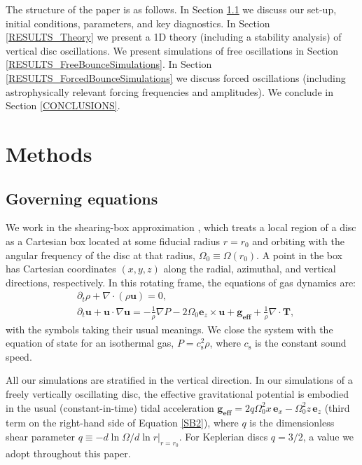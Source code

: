 \documentclass[fleqn,usenatbib]{mnras}
\begin{document}
The structure of the paper is as follows. In Section \ref{METHODS_GoverningEquations} we discuss our set-up, initial conditions, parameters, and key diagnostics. In Section \ref{RESULTS_Theory} we present a 1D theory (including a stability analysis) of vertical disc oscillations. We present simulations of free oscillations in Section \ref{RESULTS_FreeBounceSimulations}. In Section \ref{RESULTS_ForcedBounceSimulations} we discuss forced oscillations (including astrophysically relevant forcing frequencies and amplitudes). We conclude in Section \ref{CONCLUSIONS}.

\section{Methods}
\label{METHODS}

\subsection{Governing equations}
\label{METHODS_GoverningEquations}
We work in the shearing-box approximation
\citep{goldreich1965,hawley1995,latter2017local},
which treats a local region of a disc as a Cartesian box located at some fiducial radius $r = r_0$ and orbiting with the angular frequency of the disc at that radius, $\Omega_0 \equiv \Omega(r_0)$. A point in the box has
Cartesian coordinates $(x, y, z)$ along the radial, azimuthal, and vertical directions, respectively. In this rotating frame, the equations of gas dynamics are:
\begin{align}
&\partial_t \rho + \nabla \cdot (\rho \mathbf{u}) = 0, \label{SB1}\\
&\partial_t \mathbf{u} + \mathbf{u}\cdot\nabla \mathbf{u} = -\frac{1}{\rho} \nabla P - 2\Omega_0 \mathbf{e}_z \times \mathbf{u} + \mathbf{g_\text{eff}}+\frac{1}{\rho}\nabla \cdot \mathbf{T}, \label{SB2}
\end{align}
with the symbols taking their usual meanings. We close the system with the equation of state for an isothermal gas, $P = c_\text{s}^2 \rho$, where $c_\text{s}$ is the constant sound speed.

All our simulations are stratified in the vertical direction. In our simulations of a freely vertically oscillating disc, the effective gravitational potential is embodied in the usual (constant-in-time) tidal acceleration $\mathbf{g_\text{eff}}=2q\Omega_0^2x\,\mathbf{e}_x-\Omega_0^2 z\,\mathbf{e}_z$ (third term on the right-hand side of Equation \ref{SB2}), where $q$ is the dimensionless shear parameter $q \equiv -\left.d\ln{\Omega}/d\ln{r}\right\vert_{r=r_0}$. For Keplerian discs $q=3/2$, a value we adopt throughout this paper.
\end{document}
